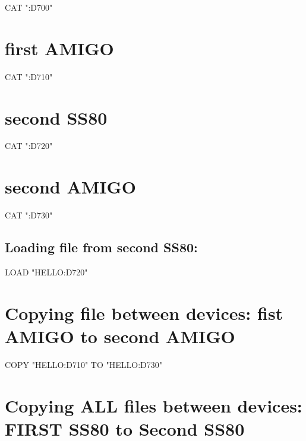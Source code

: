 \begin{DoxyPre}
  CAT ":D700"
\section*{first AMIGO}\end{DoxyPre}



\begin{DoxyPre}
  CAT ":D710"
\section*{second SS80}\end{DoxyPre}



\begin{DoxyPre}
  CAT ":D720"
\section*{second AMIGO}\end{DoxyPre}



\begin{DoxyPre}
  CAT ":D730"\end{DoxyPre}



\begin{DoxyPre}\section*{Loading file from second SS80:}\end{DoxyPre}



\begin{DoxyPre}
  LOAD "HELLO:D720"
\section*{Copying file between devices: fist AMIGO to second AMIGO}\end{DoxyPre}



\begin{DoxyPre}
  COPY "HELLO:D710" TO "HELLO:D730"
\section*{Copying ALL files between devices: FIRST SS80 to Second SS80}\end{DoxyPre}



